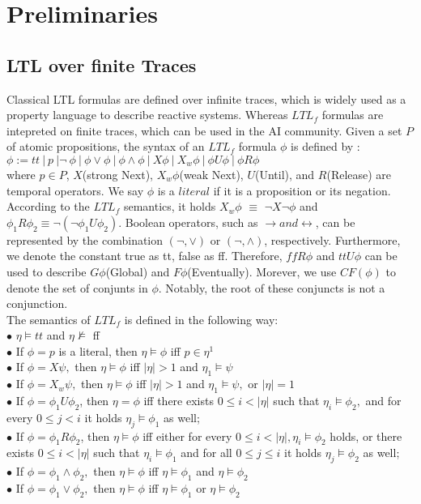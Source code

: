 \section{Preliminaries}
\subsection{LTL over finite Traces}
\noindent
Classical LTL formulas are defined over infinite traces, which is widely used as a property language to describe reactive systems. Whereas $LTL_f$ formulas are intepreted on finite traces, which can be used in the AI community. Given a set $P$ of atomic propositions, the syntax of an $LTL_f$ formula $\phi$ is defined by :  \\
$\phi:=tt \ |\ p\ |\neg\ \phi\ |\ \phi \vee \phi\ |\ \phi \wedge \phi\ |\ X \phi\ |\ X_{w} \phi\ |\ \phi U \phi\ |\ \phi R \phi$ \\
where $p \in P$, $X$(strong Next), $X_{w} \phi$(weak Next), $U$(Until), and $R$(Release) are temporal operators. We say $\phi$ is a $literal$ if it is a proposition or its negation. According to the $LTL_f$ semantics, it holds $X_{w} \phi$ $\equiv$ $\neg X \neg \phi$ and $ \phi_1 R \phi_2 \equiv \neg(\neg \phi_1 U \phi_2 )$. Boolean operators, such as $ \rightarrow and  \leftrightarrow $, can be represented by the combination $(\neg, \vee)$ or $(\neg, \wedge)$, respectively. Furthermore, we denote the constant true as tt, false as ff. Therefore, $ff R \phi$ and $tt U \phi$ can be used to describe $G\phi$(Global) and $F\phi$(Eventually). Morever, we use $CF(\phi)$ to denote the set of conjunts in $\phi$. Notably, the root of these conjuncts is not a conjunction. \\
The semantics of $LTL_f$ is defined in the following way: \\
$\bullet$ $\eta \models tt$ and $\eta \not \models $ ff\\
$\bullet$ If $\phi=p$ is a literal, then $\eta \models \phi$ iff $p \in \eta^{1}$\\
$\bullet$ If $\phi=X \psi,$ then $\eta \models \phi$ iff $|\eta|>1$ and $\eta_{1} \models \psi$\\
$\bullet$ If $\phi=X_{w} \psi,$ then $\eta \models \phi$ iff $|\eta|>1$ and $\eta_{1} \models \psi,$ or $|\eta|=1$\\
$\bullet$ If $\phi=\phi_{1} U \phi_{2}$, then $\eta=\phi$ iff there exists $0 \leq i<|\eta|$ such that $\eta_{i} \models \phi_{2},$ and for every $0 \leq j<i$ it holds $\eta_{j} \models \phi_{1}$ as well;\\
$\bullet$ If $\phi=\phi_{1} R \phi_{2}$, then $\eta \models \phi$ iff either for every $0 \leq i<|\eta|, \eta_{i}\models \phi_{2}$ holds, or there exists $0 \leq i<|\eta|$ such that $\eta_{i} \models \phi_{1}$ and for all $0 \leq j \leq i$ it holds $\eta_{j} \models \phi_{2}$ as well;\\
$\bullet$ If $\phi=\phi_{1} \wedge \phi_{2},$ then $\eta \models \phi$ iff $\eta \models \phi_{1}$ and $\eta \models \phi_{2}$ \\
$\bullet$ If $\phi=\phi_{1} \vee \phi_{2},$ then $\eta \models \phi$ iff $\eta \models \phi_{1}$ or $\eta \models \phi_{2}$ 
